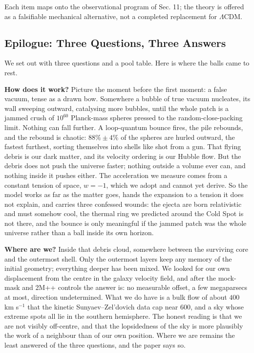 \documentclass[
]{article}
\begin{document}
Each item maps onto the observational program of Sec. 11; the theory is
offered as a falsifiable mechanical alternative, not a completed
replacement for \(\Lambda\)CDM.

\hypertarget{epilogue-three-questions-three-answers}{%
\subsection{\texorpdfstring{\textbf{Epilogue: Three Questions, Three
Answers}}{Epilogue: Three Questions, Three Answers}}\label{epilogue-three-questions-three-answers}}

We set out with three questions and a pool table. Here is where the
balls came to rest.

\textbf{How does it work?} Picture the moment before the first moment: a
false vacuum, tense as a drawn bow. Somewhere a bubble of true vacuum
nucleates, its wall sweeping outward, catalysing more bubbles, until the
whole patch is a jammed crush of \(10^{60}\) Planck-mass spheres pressed
to the random-close-packing limit. Nothing can fall further. A
loop-quantum bounce fires, the pile rebounds, and the rebound is
chaotic: \(88\% \pm 4\%\) of the spheres are hurled outward, the fastest
furthest, sorting themselves into shells like shot from a gun. That
flying debris is our dark matter, and its velocity ordering is our
Hubble flow. But the debris does not push the universe faster; nothing
outside a volume ever can, and nothing inside it pushes either. The
acceleration we measure comes from a constant tension of space,
\(w = -1\), which we adopt and cannot yet derive. So the model works as
far as the matter goes, hands the expansion to a tension it does not
explain, and carries three confessed wounds: the ejecta are born
relativistic and must somehow cool, the thermal ring we predicted around
the Cold Spot is not there, and the bounce is only meaningful if the
jammed patch was the whole universe rather than a ball inside its own
horizon.

\textbf{Where are we?} Inside that debris cloud, somewhere between the
surviving core and the outermost shell. Only the outermost layers keep
any memory of the initial geometry; everything deeper has been mixed. We
looked for our own displacement from the centre in the galaxy velocity
field, and after the mock-mask and 2M++ controls the answer is: no
measurable offset, a few megaparsecs at most, direction undetermined.
What we do have is a bulk flow of about \(400\) km s\(^{-1}\) that the
kinetic Sunyaev--Zel'dovich data cap near \(600\), and a sky whose
extreme spots all lie in the southern hemisphere. The honest reading is
that we are not visibly off-centre, and that the lopsidedness of the sky
is more plausibly the work of a neighbour than of our own position.
Where we are remains the least answered of the three questions, and the
paper says so.
\end{document}
